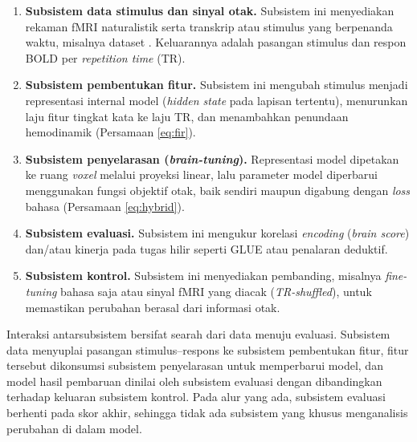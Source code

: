   \begin{enumerate}
      \item \textbf{Subsistem data stimulus dan sinyal otak.} Subsistem ini menyediakan rekaman fMRI naturalistik serta transkrip atau stimulus yang berpenanda waktu, misalnya dataset \textcite{lebel2023natural}. Keluarannya adalah pasangan stimulus dan respon BOLD per \textit{repetition time} (TR).
      \item \textbf{Subsistem pembentukan fitur.} Subsistem ini mengubah stimulus menjadi representasi internal model (\textit{hidden state} pada lapisan tertentu), menurunkan laju fitur tingkat kata ke laju TR, dan menambahkan penundaan hemodinamik (Persamaan \ref{eq:fir}).
      \item \textbf{Subsistem penyelarasan (\textit{brain-tuning}).} Representasi model dipetakan ke ruang \textit{voxel} melalui proyeksi linear, lalu parameter model diperbarui menggunakan fungsi objektif otak, baik sendiri maupun digabung dengan \textit{loss} bahasa (Persamaan \ref{eq:hybrid}).
      \item \textbf{Subsistem evaluasi.} Subsistem ini mengukur korelasi \textit{encoding} (\textit{brain score}) dan/atau kinerja pada tugas hilir seperti GLUE atau penalaran deduktif.
      \item \textbf{Subsistem kontrol.} Subsistem ini menyediakan pembanding, misalnya \textit{fine-tuning} bahasa saja atau sinyal fMRI yang diacak (\textit{TR-shuffled}), untuk memastikan perubahan berasal dari informasi otak.
  \end{enumerate}

  Interaksi antarsubsistem bersifat searah dari data menuju evaluasi. Subsistem data menyuplai pasangan stimulus--respons ke subsistem pembentukan fitur, fitur tersebut dikonsumsi subsistem penyelarasan untuk memperbarui model, dan model hasil pembaruan dinilai oleh subsistem evaluasi dengan dibandingkan terhadap keluaran subsistem kontrol. Pada alur yang ada, subsistem evaluasi berhenti pada skor akhir, sehingga tidak ada subsistem yang khusus menganalisis perubahan di dalam model.

